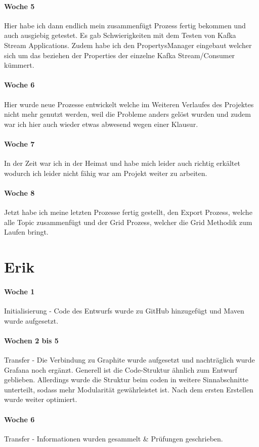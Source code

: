 \paragraph{Woche 5}
Hier habe ich dann endlich mein zusammenfügt Prozess fertig bekommen und auch ausgiebig getestet. Es gab Schwierigkeiten mit dem Testen von Kafka Stream Applications. Zudem habe ich den PropertysManager eingebaut welcher sich um das beziehen der Properties der einzelne Kafka Stream/Consumer kümmert.
\paragraph{Woche 6}
Hier wurde neue Prozesse entwickelt welche im Weiteren Verlaufes des Projektes nicht mehr genutzt werden, weil die Probleme anders gelöst wurden und zudem war ich hier auch wieder etwas abwesend wegen einer Klausur.
\paragraph{Woche 7}
In der Zeit war ich in der Heimat und habe mich leider auch richtig erkältet wodurch ich leider nicht fähig war am Projekt weiter zu arbeiten.
\paragraph{Woche 8}
Jetzt habe ich meine letzten Prozesse fertig gestellt, den Export Prozess, welche alle Topic zusammenfügt und der Grid Prozess, welcher die Grid Methodik zum Laufen bringt.

\newpage
\section{Erik}
\paragraph{Woche 1}
Initialisierung - Code des Entwurfs wurde zu GitHub hinzugefügt und Maven wurde aufgesetzt.
\paragraph{Wochen 2 bis 5}
Transfer - Die Verbindung zu Graphite wurde aufgesetzt und nachträglich wurde Grafana noch ergänzt. Generell ist die Code-Struktur ähnlich zum Entwurf geblieben. Allerdings wurde die Struktur beim coden in weitere Sinnabschnitte unterteilt, sodass mehr Modularität gewährleistet ist. Nach dem ersten Erstellen wurde weiter optimiert.
\paragraph{Woche 6}
Transfer - Informationen wurden gesammelt \& Prüfungen geschrieben.
